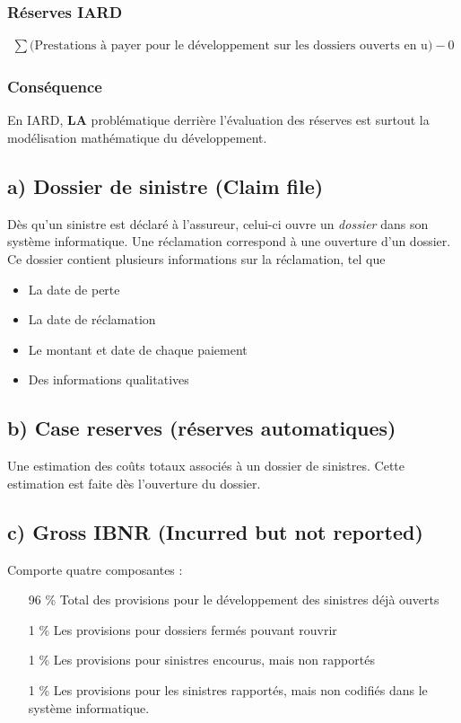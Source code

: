 \subsubsection*{Réserves IARD}

\begin{align*}
\sum \Bigg( \text{Prestations à payer pour le développement sur les dossiers ouverts en u} \Bigg) - 0
\end{align*}

\subsubsection*{Conséquence}
En IARD, \textbf{LA} problématique derrière l'évaluation des réserves est surtout la modélisation mathématique du développement.


\subsection*{a) Dossier de sinistre (Claim file)}
Dès qu'un sinistre est déclaré à l'assureur, celui-ci ouvre un \textit{dossier} dans son système informatique. Une réclamation correspond à une ouverture d'un dossier. Ce dossier contient plusieurs informations sur la réclamation, tel que
\begin{itemize}
\item La date de perte
\item La date de réclamation
\item Le montant et date de chaque paiement
\item Des informations qualitatives
\end{itemize}

\subsection*{b) Case reserves (réserves automatiques)}
Une estimation des coûts totaux associés à un dossier de sinistres. Cette estimation est faite dès l'ouverture du dossier.

\subsection*{c) Gross IBNR (Incurred but not reported)}

Comporte quatre composantes :
\begin{itemize}
\item[96 \%] Total des provisions pour le développement des sinistres déjà ouverts
\item[1 \%] Les provisions pour dossiers fermés pouvant rouvrir
\item[1 \%] Les provisions pour sinistres encourus, mais non rapportés
\item[1 \%] Les provisions pour les sinistres rapportés, mais non codifiés dans le système informatique.
\end{itemize}

